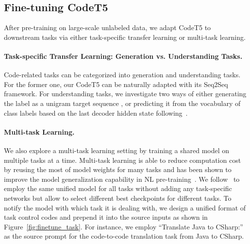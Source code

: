 \documentclass[11pt]{article}
\begin{document}
\subsection{Fine-tuning CodeT5} \label{model:finetune}
After pre-training on large-scale unlabeled data, we adapt CodeT5 to downstream tasks via either task-specific transfer learning or multi-task learning.

\paragraph{Task-specific Transfer Learning: Generation vs. Understanding Tasks.} Code-related tasks can be categorized into generation and understanding tasks. For the former one, our CodeT5 can  be naturally adapted with its Seq2Seq framework. 
For understanding tasks, we investigate two ways of either generating the label as a unigram target sequence \cite{DBLP:journals/jmlr/RaffelSRLNMZLL20}, or predicting it from the vocabulary of class labels based on the last decoder hidden state following~\citet{DBLP:conf/acl/LewisLGGMLSZ20}.

\paragraph{Multi-task Learning.}
We also explore a multi-task learning setting by training a shared model on multiple tasks at a time. 
Multi-task learning is able to reduce computation cost by reusing the most of model weights for many tasks and has been shown to improve the model generalization capability in NL pre-training~\cite{DBLP:conf/acl/LiuHCG19}.
We follow~\citet{DBLP:journals/jmlr/RaffelSRLNMZLL20} to employ the same unified model for all tasks without adding any task-specific networks but allow to select different best checkpoints for different tasks. 
To notify the model with which task it is dealing with, we design a unified format of task control codes and prepend it into the source inputs as shown in Figure~\ref{fig:finetune_task}. For instance, we employ ``Translate Java to CSharp:'' as the source prompt for the code-to-code translation task from Java to CSharp. 
\end{document}
